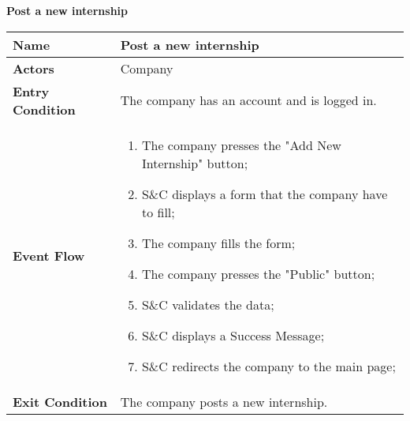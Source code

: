 \begin{enumerate}[label=\textbf{[US\arabic*]}, left = 0pt, align = left, resume]
\begin{longtable}{|l|p{11cm}|}
            \end{longtable}

            \newpage
            \item \textbf{Post a new internship}
            
            \begin{longtable}{|l|p{11cm}|}  
                \hline
                \textbf{Name} & 
                    \textbf{Post a new internship} \\
                \hline
                
                \textbf{Actors} & 
                    Company \\
                \hline
                
                \textbf{Entry Condition} & 
                    The company has an account and is logged in. \\
                \hline
                
                \textbf{Event Flow} &
                    \begin{enumerate}[label=\arabic*., itemsep=0.2em]
                        \item The company presses the "Add New Internship" button;
                        \item S\&C displays a form that the company have to fill;
                        \item The company fills the form;
                        \item The company presses the "Public" button;
                        \item S\&C validates the data;
                        \item S\&C displays a Success Message;
                        \item S\&C redirects the company to the main page;
                    \end{enumerate} \\
                \hline
                
                \textbf{Exit Condition} & 
                    The company posts a new internship. \\
                \hline
                

\end{longtable}
\end{enumerate}
